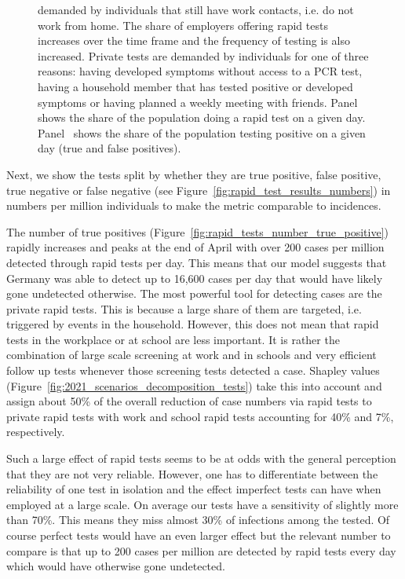 \begin{figure}[ht]
{        demanded by individuals that still have work contacts, i.e. do not work from
        home. The share of employers offering rapid tests increases over the time frame
        and the frequency of testing is also increased. Private tests are demanded by
        individuals for one of three reasons: having developed symptoms without access
        to a PCR test, having a household member that has tested positive or developed
        symptoms or having planned a weekly meeting with friends.
        Panel~ shows the share of the
        population doing a rapid test on a given day.
        Panel~ shows the share of the population
        testing positive on a given day (true and false positives).}
\end{figure}

\FloatBarrier

Next, we show the tests split by whether they are true positive, false positive, true
negative or false negative (see Figure~\ref{fig:rapid_test_results_numbers}) in numbers
per million individuals to make the metric comparable to incidences.

The number of true positives (Figure~\ref{fig:rapid_tests_number_true_positive}) rapidly
increases and peaks at the end of April with over 200 cases per million detected through
rapid tests per day. This means that our model suggests that Germany was able to detect
up to 16,600 cases per day that would have likely gone undetected otherwise. The most
powerful tool for detecting cases are the private rapid tests. This is because a large
share of them are targeted, i.e. triggered by events in the household. However, this
does not mean that rapid tests in the workplace or at school are less important. It is rather
the combination of large scale screening at work and in schools and very efficient
follow up tests whenever those screening tests detected a case. Shapley values
(Figure~\ref{fig:2021_scenarios_decomposition_tests}) take this into account and
assign about 50\% of the overall reduction of case numbers via rapid tests to private
rapid tests with work and school rapid tests accounting for 40\% and 7\%,
respectively.

Such a large effect of rapid tests seems to be at odds with the general perception that
they are not very reliable. However, one has to differentiate between the reliability of
one test in isolation and the effect imperfect tests can have when employed at a large
scale. On average our tests have a sensitivity of slightly more than 70\%. This means
they miss almost 30\% of infections among the tested. Of course perfect tests would have
an even larger effect but the relevant number to compare is that up to 200 cases per
million are detected by rapid tests every day which would have otherwise gone undetected.

